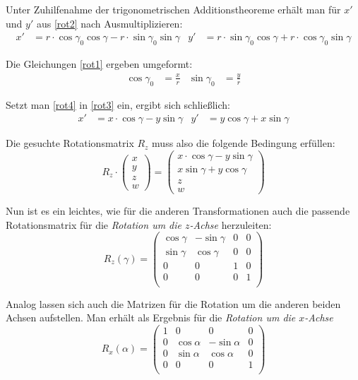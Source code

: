 Unter Zuhilfenahme der trigonometrischen Additionstheoreme erhält man für $x'$ und $y'$ aus \ref{rot2} nach Ausmultiplizieren:
\begin{align}
 \label{rot3}
 x' &= r \cdot \cos \gamma_0 \cos \gamma - r \cdot \sin \gamma_0 \sin \gamma &  y' &= r \cdot \sin \gamma_0 \cos \gamma + r \cdot \cos \gamma_0 \sin \gamma
\end{align}

Die Gleichungen \ref{rot1} ergeben umgeformt:
\begin{align}
 \label{rot4}
 \cos \gamma_0 &= \frac{x}{r} & \sin \gamma_0 &= \frac{y}{r}
\end{align}

Setzt man \ref{rot4} in \ref{rot3} ein, ergibt sich schließlich:
\begin{align}
 x' &= x \cdot \cos \gamma - y \sin \gamma &  y' &= y \cos \gamma + x \sin \gamma
\end{align}

Die gesuchte Rotationsmatrix $R_{z}$ muss also die folgende Bedingung erfüllen:
\begin{equation}
 R_{z} \cdot
 \begin{pmatrix}
  x \\
  y \\
  z \\
  w
 \end{pmatrix}
 = 
 \begin{pmatrix}
  x \cdot \cos \gamma - y \sin \gamma \\
  x \sin \gamma + y \cos \gamma \\
  z \\
  w
 \end{pmatrix}
\end{equation}

Nun ist es ein leichtes, wie für die anderen Transformationen auch die passende Rotationsmatrix für die \emph{Rotation um die $z$-Achse} herzuleiten:
\begin{equation}
 R_z{(\gamma)}
 = 
 \begin{pmatrix}
  \cos \gamma & -\sin \gamma & 0 & 0 \\
  \sin \gamma &  \cos \gamma & 0 & 0 \\
  0 & 0 & 1 & 0 \\
  0 & 0 & 0 & 1 \\
 \end{pmatrix}
\end{equation}

Analog lassen sich auch die Matrizen für die Rotation um die anderen beiden Achsen aufstellen. Man erhält als Ergebnis für die \emph{Rotation um die $x$-Achse}
\begin{equation}
 R_x{(\alpha)}
 = 
 \begin{pmatrix}
  1 & 0 & 0 & 0 \\
  0 & \cos \alpha & -\sin \alpha & 0 \\
  0 & \sin \alpha &  \cos \alpha & 0 \\
  0 & 0 & 0 & 1 \\
 \end{pmatrix}
\end{equation}


